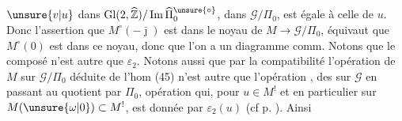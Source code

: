 $\unsure{v|u}$ dans $\mathrm{Gl}(2,\widehat{\mathbb Z})/\operatorname{Im}\widehat{\Pi}_0^{\unsure{\circ}}$,  dans $\mathcal G/\Pi_0$, est égale à celle de $u$. Donc l'assertion que $M^\circ(-\bar\jmath)$ est dans le noyau de $M\longrightarrow\mathcal G/\Pi_0$, équivaut  que $M^\circ(0)$ est dans ce noyau, donc que l'on a un diagramme comm.
Notons que le composé
n'est autre que $\varepsilon_2$. Notons aussi que par la compatibilité
l'opération de $M$ sur $\mathcal G/\Pi_0$ déduite de l'hom (45) n'est autre que l'opération , des  sur $\mathcal G$ en passant au quotient par $\Pi_0$, opération qui, pour $u\in M^!$ et en particulier sur $M(\unsure{\omega|0})\subset M^!$, est donnée par $\varepsilon_2(u)$ (cf p. ). Ainsi

